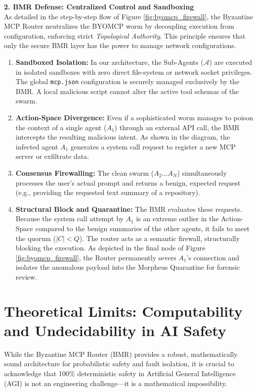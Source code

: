 \documentclass[a4paper,11pt,twocolumn]{article}
\theoremstyle{definition}
\theoremstyle{plain}
\begin{document}
\pagebreak

\textbf{2. BMR Defense: Centralized Control and Sandboxing} \\
As detailed in the step-by-step flow of Figure \ref{fig:byomcp_firewall}, the Byzantine MCP Router neutralizes the BYOMCP worm by decoupling execution from configuration, enforcing strict \textit{Topological Authority}. This principle ensures that only the secure BMR layer has the power to manage network configurations.

\begin{enumerate}
    \item \textbf{Sandboxed Isolation:} In our architecture, the Sub-Agents ($\mathcal{A}$) are executed in isolated sandboxes with zero direct file-system or network socket privileges. The global \texttt{mcp.json} configuration is securely managed exclusively by the BMR. A local malicious script cannot alter the active tool schemas of the swarm.
    \item \textbf{Action-Space Divergence:} Even if a sophisticated worm manages to poison the context of a single agent ($A_1$) through an external API call, the BMR intercepts the resulting malicious intent. As shown in the diagram, the infected agent $A_1$ generates a system call request to register a new MCP server or exfiltrate data.
    \item \textbf{Consensus Firewalling:} The clean swarm ($A_2 \dots A_N$) simultaneously processes the user's actual prompt and returns a benign, expected request (e.g., providing the requested text summary of a repository). 
    \item \textbf{Structural Block and Quarantine:} The BMR evaluates these requests. Because the system call attempt by $A_1$ is an extreme outlier in the Action-Space compared to the benign summaries of the other agents, it fails to meet the quorum ($|C| < Q$). The router acts as a semantic firewall, structurally blocking the execution. As depicted in the final node of Figure \ref{fig:byomcp_firewall}, the Router permanently severs $A_1$'s connection and isolates the anomalous payload into the Morpheus Quarantine for forensic review.
\end{enumerate}

\section{Theoretical Limits: Computability and Undecidability in AI Safety}

While the Byzantine MCP Router (BMR) provides a robust, mathematically sound architecture for probabilistic safety and fault isolation, it is crucial to acknowledge that 100\% deterministic safety in Artificial General Intelligence (AGI) is not an engineering challenge—it is a mathematical impossibility.
\end{document}
